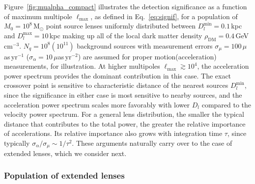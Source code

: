 \documentclass[prd,aps,10pt,nofootinbib,twocolumn,superscriptaddress,preprintnumbers,balancelastpage,longbibliography]{revtex4-1}
\begin{document}
Figure~\ref{fig:mualpha_compact} illustrates the detection significance as a function of maximum multipole $\ell_\mathrm{max}$, as defined in Eq.~\ref{eq:signif}, for a population of $M_0=10^8$\,M$_\odot$ point source lenses uniformly distributed between $D_l^{\mathrm{min}}=0.1$\,kpc and $D_l^{\mathrm{max}}=10$\,kpc making up all of the local dark matter density $\rho_\mathrm{DM}=0.4$\,GeV\,cm$^{-3}$. $N_q=10^8 (10^{11})$ background sources with measurement errors $\sigma_\mu=100\,\mu$as\,yr$^{-1}$ ($\sigma_\alpha=10\,\mu$as\,yr$^{-2}$) are assumed for proper motion(acceleration) measurements, for illustration. At higher multipoles $\ell_\mathrm{max}\gtrsim10^4$, the acceleration power spectrum provides the dominant contribution in this case. The exact crossover point is sensitive to characteristic distance of the nearest sources $D_{l}^{\mathrm{min}}$, since the significance in either case is most sensitive to nearby sources, and the acceleration power spectrum scales more favorably with lower $D_{l}$ compared to the velocity power spectrum. For a general lens distribution, the smaller the typical distance that contributes to the total power, the greater the relative importance of accelerations. Its relative importance also grows with integration time $\tau$, since typically $\sigma_\alpha/\sigma_\mu\sim1/\tau^2$. These arguments naturally carry over to the case of extended lenses, which we consider next.

\subsubsection{Population of extended lenses}
\label{sec:extended_pop}
\end{document}
